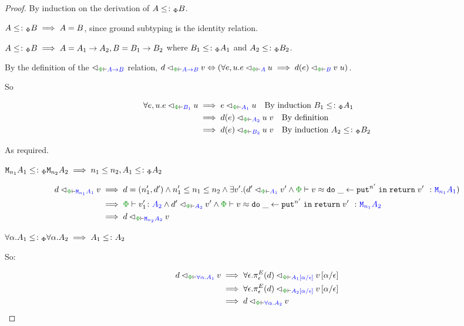 \documentclass{Report}
\newcommand\eLogRel[4]{\logRel{#2}{\wellformed{#1}{#3}}{#4}}
\newcommand\peLogRel[3]{\eLogRel{\P}{#1}{#2}{#3}}
\newcommand{\zptyperelation}[2]{\typerelation{\P}{#1}{#2}}
\newcommand{\zpberelation}[2]{\berelation{\P}{#1}{#2}}
\newcommand{\fapply}[0]{^E}
\newcommand{\pe}[0]{\pi_\e}
\begin{document}
\begin{proof}
    By induction on the derivation of $A\leq\colon_\Phi B$.

    \case{\sground}
        $A\leq\colon_\Phi B\implies A = B$, since ground subtyping is the identity relation.

    \case{\sfun}
        $A\leq\colon_\Phi B\implies A = A_1\rightarrow A_2, B = B_1\rightarrow B_2$ where $B_1\leq\colon_\Phi A_1$ and $A_2\leq\colon_\Phi B_2$.

        By the definition of the $\relates_{\wellformed{\P}{\ab}}$ relation, $\peLogRel{d}{\ab}{v} \Leftrightarrow (\forall e, u. \peLogRel{e}{A}{u}\implies \peLogRel{d(e)}{B}{\apply{v}{u}})$.

        So 

        \begin{align*}
            \forall e, u. \peLogRel{e}{B_1}{u} & \implies \peLogRel{e}{A_1}{u} \qt{By induction $B_1\subtypep A_1$}\\
            & \implies \peLogRel{d(e)}{A_2}{\apply{u}{v}}\qt{By definition}\\
            & \implies \peLogRel{d(e)}{B_2}{\apply{u}{v}}\qt{By induction $A_2\subtypep B_2$}
        \end{align*}

        As required.
    \case{\seffect}

    $\texttt{M}_{n_1}{A_1} \leq\colon_\Phi \texttt{M}_{n_2}{A_2} \implies n_1\leq n_2, A_1\leq\colon_\Phi A_2$

    \begin{align*}
        \peLogRel{d}{\M{n_1}{A_1}}{v} & \implies  d=(n_1', d') \wedge n_1' \leq n_1\leq n_2 \wedge \exists v'. (\peLogRel{d'}{A_1}{v'} \wedge\zpberelation{v}{\doin{\_}{\put^{n'}}{\return{v'}}}{\M{n_1}{A_1}})\\
        & \implies \zptyperelation{v_1'}{A_2} \wedge \peLogRel{d'}{A_2}{v'} \wedge \zpberelation{v}{\doin{\_}{\put^{n'}}{\return{v'}}}{\M{n_1}{A_2}}\\
        & \implies \peLogRel{d}{\M{n_2}{A_2}}{v}
    \end{align*}

    \case{\squant}
    $\forall \alpha. A_1\leq\colon_\Phi \forall \alpha. A_2\implies A_1\leq\colon A_2$

    So:

    \begin{align*}
        \peLogRel{d}{\all{\a}{A_1}}{v} & \implies \peLogRel{\all{\e}{\pe\fapply(d)}}{A_1\ssub{\e}{\a}}{v\ssub{\e}{\a}}\\
        & \implies \peLogRel{\all{\e}{\pe\fapply(d)}}{A_2\ssub{\e}{\a}}{v\ssub{\e}{\a}}\\
        & \implies \peLogRel{d}{\all{\a}{A_2}}{v}
    \end{align*}
\end{proof}
\end{document}
